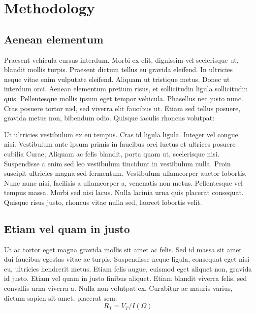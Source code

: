 \documentclass[11pt,oneside,openright]{book}
\begin{document}
\chapter{Methodology}\label{cpt:method}

\section{Aenean elementum}

Praesent vehicula cursus interdum. Morbi ex elit, dignissim vel scelerisque ut, blandit mollis turpis. Praesent dictum tellus eu gravida eleifend. In ultricies neque vitae enim vulputate eleifend. Aliquam ut tristique metus. Donec ut interdum orci. Aenean elementum pretium risus, et sollicitudin ligula sollicitudin quis. Pellentesque mollis ipsum eget tempor vehicula. Phasellus nec justo nunc. Cras posuere tortor nisl, sed viverra elit faucibus ut. Etiam sed tellus posuere, gravida metus non, bibendum odio. Quisque iaculis rhoncus volutpat:

Ut ultricies vestibulum ex eu tempus. Cras id ligula ligula. Integer vel congue nisi. Vestibulum ante ipsum primis in faucibus orci luctus et ultrices posuere cubilia Curae; Aliquam ac felis blandit, porta quam ut, scelerisque nisi. Suspendisse a enim sed leo vestibulum tincidunt in vestibulum nulla. Proin suscipit ultricies magna sed fermentum. Vestibulum ullamcorper auctor lobortis. Nunc nunc nisi, facilisis a ullamcorper a, venenatis non metus. Pellentesque vel tempus massa. Morbi sed nisi lacus. Nulla lacinia urna quis placerat consequat. Quisque risus justo, rhoncus vitae nulla sed, laoreet lobortis velit.

\section{Etiam vel quam in justo}

Ut ac tortor eget magna gravida mollis sit amet ac felis. Sed id massa sit amet dui faucibus egestas vitae ac turpis. Suspendisse neque ligula, consequat eget nisi eu, ultricies hendrerit metus. Etiam felis augue, euismod eget aliquet non, gravida id justo. Etiam vel quam in justo finibus aliquet. Etiam blandit viverra felis, sed convallis urna viverra a. Nulla non volutpat ex. Curabitur ac mauris varius, dictum sapien sit amet, placerat sem:
\begin{equation}
R_T=V_T/I(\Omega)
\end{equation}
\end{document}
